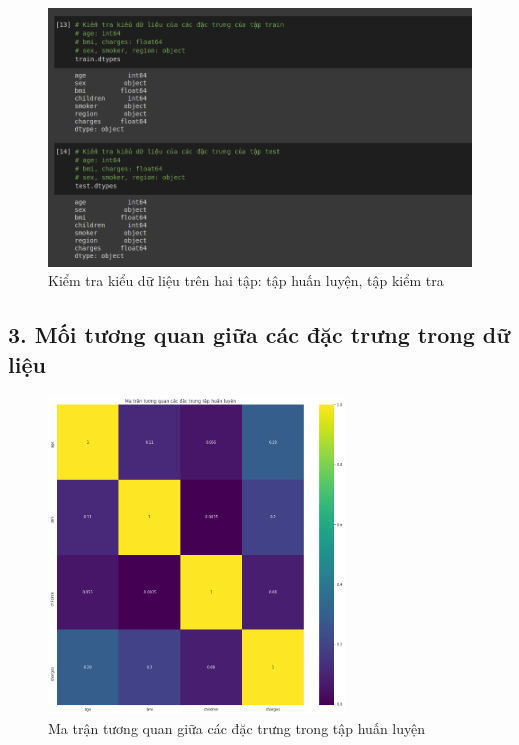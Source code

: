 \documentclass{article}
\begin{document}
	\begin{figure}[H]
		\centering
		\includegraphics[width=1\textwidth]{images/data_types_train_test.png}
		\caption{Kiểm tra kiểu dữ liệu trên hai tập: tập huấn luyện, tập kiểm tra}
		\label{fig:writing-thesis}
	\end{figure}

	
	\subsection{3. Mối tương quan giữa các đặc trưng trong dữ liệu}
	\begin{figure}[H]
		\centering
		\includegraphics[width=0.7\textwidth]{images/corr_matrix_train.png}
		\caption{Ma trận tương quan giữa các đặc trưng trong tập huấn luyện}
		\label{fig:writing-thesis}
	\end{figure}
	
\end{document}

